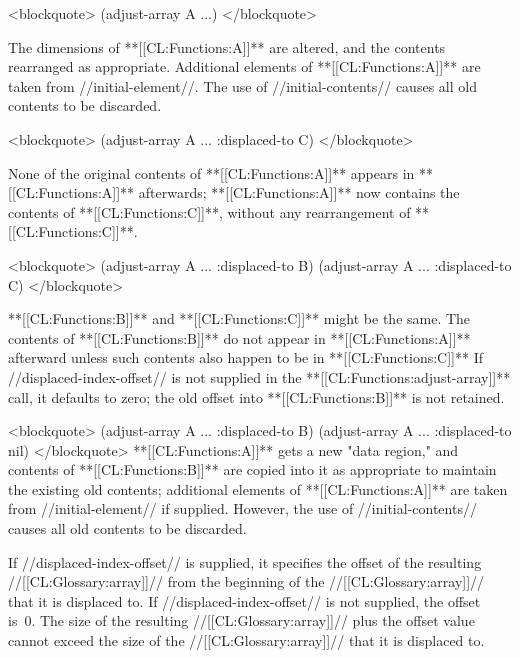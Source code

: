 
<blockquote> (adjust-array A ...) </blockquote>

The dimensions of **[[CL:Functions:A]]** are altered, and the contents rearranged as appropriate. Additional elements of **[[CL:Functions:A]]** are taken from //initial-element//. The use of //initial-contents// causes all old contents to be discarded.


<blockquote> (adjust-array A ... :displaced-to C) </blockquote>

None of the original contents of **[[CL:Functions:A]]** appears in **[[CL:Functions:A]]** afterwards; **[[CL:Functions:A]]** now contains the contents of **[[CL:Functions:C]]**, without any rearrangement of **[[CL:Functions:C]]**.


<blockquote> (adjust-array A ... :displaced-to B) (adjust-array A ... :displaced-to C) </blockquote>

**[[CL:Functions:B]]** and **[[CL:Functions:C]]** might be the same. The contents of **[[CL:Functions:B]]** do not appear in **[[CL:Functions:A]]** afterward unless such contents also happen to be in **[[CL:Functions:C]]** If //displaced-index-offset// is not supplied in the **[[CL:Functions:adjust-array]]** call, it defaults to zero; the old offset into **[[CL:Functions:B]]** is not retained.



<blockquote> (adjust-array A ... :displaced-to B) (adjust-array A ... :displaced-to nil) </blockquote> **[[CL:Functions:A]]** gets a new "data region," and contents of **[[CL:Functions:B]]** are copied into it as appropriate to maintain the existing old contents; additional elements of **[[CL:Functions:A]]** are taken from //initial-element// if supplied. However, the use of //initial-contents// causes all old contents to be discarded.




If //displaced-index-offset// is supplied, it specifies the offset of the resulting //[[CL:Glossary:array]]// from the beginning of the //[[CL:Glossary:array]]// that it is displaced to. If //displaced-index-offset// is not supplied, the offset is~0. The size of the resulting //[[CL:Glossary:array]]// plus the offset value cannot exceed the size of the //[[CL:Glossary:array]]// that it is displaced to.

